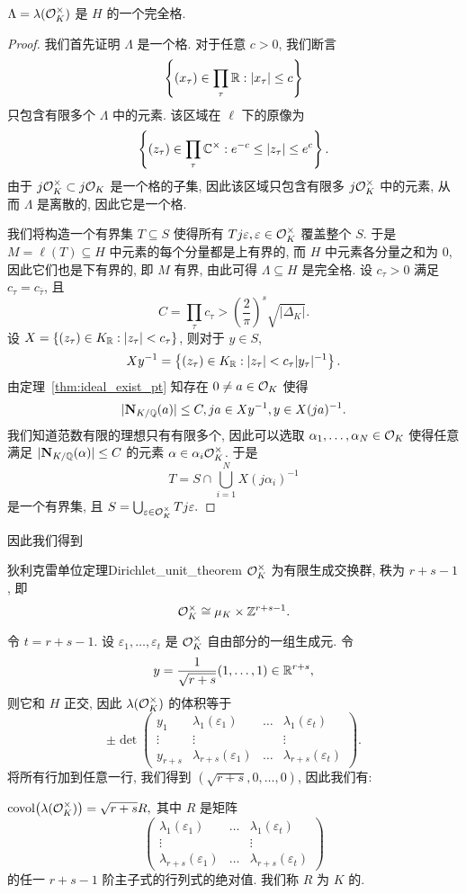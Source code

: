 \begin{theorem}{}{}
$\Lambda=\lambda({\mathcal{O}}_K^\times)$ 是 $H$ 的一个完全格.
\end{theorem}
\begin{proof}
我们首先证明 $\Lambda$ 是一个格. 对于任意 $c>0$, 我们断言 
	\[\left\{(x_\tau)\in\prod_\tau {\mathbb{R}}: |x_\tau|\le c\right\}\]
只包含有限多个 $\Lambda$ 中的元素. 该区域在 $\ell$ 下的原像为
	\[\left\{(z_\tau)\in\prod_\tau{\mathbb{C}}^\times: e^{-c}\le |z_\tau|\le e^c\right\}.\]
由于 $j{\mathcal{O}}_K^\times\subset j{\mathcal{O}}_K$ 是一个格的子集, 因此该区域只包含有限多 $j{\mathcal{O}}_K^\times$ 中的元素, 从而 $\Lambda$ 是离散的, 因此它是一个格.

我们将构造一个有界集 $T\subseteq S$ 使得所有 $Tj\varepsilon,\varepsilon\in {\mathcal{O}}_K^\times$ 覆盖整个 $S$. 于是 $M=\ell(T)\subseteq H$ 中元素的每个分量都是上有界的, 而 $H$ 中元素各分量之和为 $0$, 因此它们也是下有界的, 即 $M$ 有界, 由此可得 $\Lambda\subseteq H$ 是完全格. 设 $c_\tau>0$ 满足 $c_\tau=c_{\bar\tau}$, 且
	\[C=\prod_\tau c_\tau>\left(\frac{2}{\pi}\right)^s\sqrt{|\Delta_K|}.\]
设 $X=\left\{(z_\tau)\in K_{\mathbb{R}}: |z_\tau|<c_\tau\right\}$, 则对于 $y\in S$,
	\[Xy^{-1}=\left\{(z_\tau)\in K_{\mathbb{R}}: |z_\tau|<c_\tau|y_\tau|^{-1}\right\}.\]
由定理~\ref{thm:ideal_exist_pt} 知存在 $0\neq a\in{\mathcal{O}}_K$ 使得 
	\[|{\mathbf{N}}_{K/{\mathbb{Q}}}(a)|\le C, ja\in Xy^{-1}, y\in X(ja)^{-1}.\]
我们知道范数有限的理想只有有限多个, 因此可以选取 $\alpha_1,\dots,\alpha_N\in{\mathcal{O}}_K$ 使得任意满足 $|{\mathbf{N}}_{K/{\mathbb{Q}}}(\alpha)|\le C$ 的元素 $\alpha\in \alpha_i {\mathcal{O}}_K^\times$. 于是
	\[T=S\cap \bigcup_{i=1}^N X(j \alpha_i)^{-1}\]
是一个有界集, 且 $S=\bigcup_{\varepsilon\in{\mathcal{O}}_K^\times} Tj\varepsilon.$
\end{proof}

因此我们得到
\begin{theorem}{狄利克雷单位定理}{Dirichlet_unit_theorem}
${\mathcal{O}}_K^\times$ 为有限生成交换群, 秩为 $r+s-1$, 即
	\[{\mathcal{O}}_K^\times\cong \mu_K\times {\mathbb{Z}}^{r+s-1}.\]
\end{theorem}

令  $t=r+s-1$. 设 $\varepsilon_1,\dots,\varepsilon_t$ 是 ${\mathcal{O}}_K^\times$ 自由部分的一组生成元. 令
	\[y=\frac{1}{\sqrt{r+s}}(1,\dots,1)\in{\mathbb{R}}^{r+s},\]
则它和 $H$ 正交, 因此 $\lambda({\mathcal{O}}_K^\times)$ 的体积等于
	\[\pm\det\begin{pmatrix}
y_1 & \lambda_1(\varepsilon_1) &\dots& \lambda_1(\varepsilon_t)\\
\vdots & \vdots & & \vdots\\
y_{r+s} & \lambda_{r+s}(\varepsilon_1) &\dots& \lambda_{r+s}(\varepsilon_t)
\end{pmatrix}.\]
将所有行加到任意一行, 我们得到 $(\sqrt{r+s},0,\dots,0)$, 因此我们有:
\begin{proposition}{}{}
${\mathrm{covol}}\bigl(\lambda({\mathcal{O}}_K^\times)\bigr)=\sqrt{r+s}R,$ 其中 $R$ 是矩阵
	\[\begin{pmatrix}
\lambda_1(\varepsilon_1) &\dots& \lambda_1(\varepsilon_t)\\
\vdots & & \vdots\\
\lambda_{r+s}(\varepsilon_1) &\dots& \lambda_{r+s}(\varepsilon_t)
\end{pmatrix}\]
的任一 $r+s-1$ 阶主子式的行列式的绝对值. 我们称 $R$ 为 $K$ 的.
\end{proposition}


